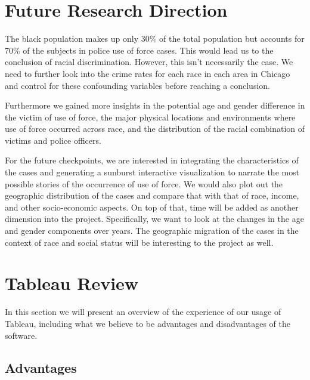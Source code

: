\documentclass[10pt]{article}
\begin{document}
\section{Future Research Direction}

The black population makes up only 30\% of the total population but accounts for 70\% of the subjects in police use of force cases. This would lead us to the conclusion of racial discrimination. However, this isn’t necessarily the case. We need to further look into the crime rates for each race in each area in Chicago and control for these confounding variables before reaching a conclusion.

Furthermore we gained more insights in the potential age and gender difference in the victim of use of force, the major physical locations and environments where use of force occurred across race, and the distribution of the racial combination of victims and police officers.

For the future checkpoints, we are interested in integrating the characteristics of the cases and generating a sunburst interactive visualization to narrate the most possible stories of the occurrence of use of force. We would also plot out the geographic distribution of the cases and compare that with that of race, income, and other socio-economic aspects. On top of that, time will be added as another dimension into the project. Specifically, we want to look at the changes in the age and gender components over years. The geographic migration of the cases in the context of race and social status will be interesting to the project as well.




\section{Tableau Review}

In this section we will present an overview of the experience of our usage of Tableau, including what we believe to be advantages and disadvantages of the software.

\subsection{Advantages}
\end{document}
